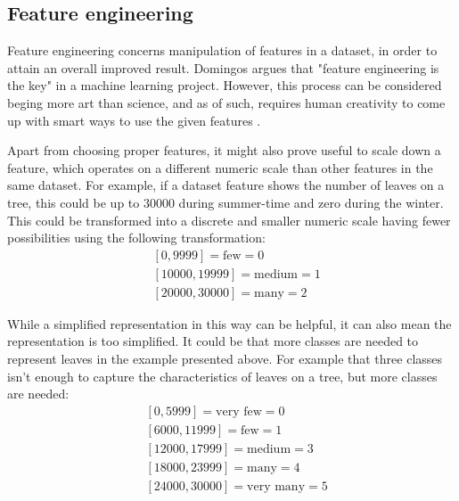 	\subsection{Feature engineering}
	Feature engineering concerns manipulation of features in a dataset, in order to attain an overall improved result. Domingos \cite{ARTICLE:3} argues that "feature engineering is the key" in a machine learning project. However, this process can be considered beging more art than science, and as of such, requires human creativity to come up with smart ways to use the given features \cite{BOOK:9}. 

	Apart from choosing proper features, it might also prove useful to scale down a feature, which operates on a different numeric scale than other features in the same dataset. For example, if a dataset feature shows the number of leaves on a tree, this could be up to 30000 during summer-time and zero during the winter. This could be transformed into a discrete and smaller numeric scale having fewer possibilities using the following transformation: 
\begin{align*} 
	& [0, 9999] = \mbox{few} = 0 \\
	& [10000, 19999] = \mbox{medium} = 1 \\
	& [20000, 30000] = \mbox{many} = 2 
\end{align*}
	
	While a simplified representation in this way can be helpful, it can also mean the representation is too simplified. It could be that more classes are needed to represent leaves in the example presented above. For example that three classes isn't enough to capture the characteristics of leaves on a tree, but more classes are needed:
\begin{align*} 
	& [0, 5999] = \mbox{very few} = 0 \\
	& [6000, 11999] = \mbox{few} = 1 \\ 
	& [12000, 17999] = \mbox{medium} = 3 \\
	& [18000, 23999] = \mbox{many} = 4 \\
	& [24000, 30000] = \mbox{very many} = 5 
\end{align*}





